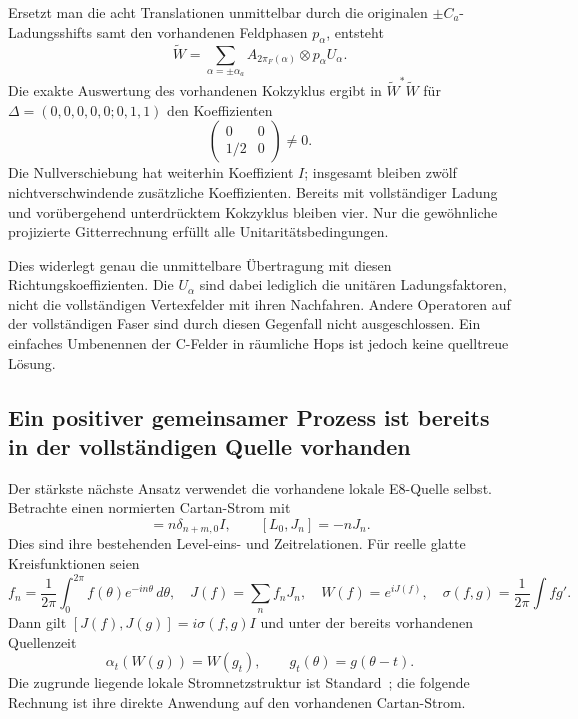 Ersetzt man die acht Translationen unmittelbar durch die originalen $\pm C_a$-Ladungsshifts samt den vorhandenen Feldphasen $p_\alpha$, entsteht
\begin{equation}
\widetilde W=\sum_{\alpha=\pm\alpha_a}A_{2\pi_F(\alpha)}\otimes p_\alpha U_\alpha.
\end{equation}
Die exakte Auswertung des vorhandenen Kokzyklus ergibt in $\widetilde W^*\widetilde W$ für
$\Delta=(0,0,0,0,0;0,1,1)$ den Koeffizienten
\begin{equation}\label{eq:nativehopfailure}
\boxed{\begin{pmatrix}0&0\\1/2&0\end{pmatrix}\ne0.}
\end{equation}
Die Nullverschiebung hat weiterhin Koeffizient $I$; insgesamt bleiben zwölf nichtverschwindende zusätzliche Koeffizienten. Bereits mit vollständiger Ladung und vorübergehend unterdrücktem Kokzyklus bleiben vier. Nur die gewöhnliche projizierte Gitterrechnung erfüllt alle Unitaritätsbedingungen.

Dies widerlegt genau die unmittelbare Übertragung mit diesen Richtungskoeffizienten. Die $U_\alpha$ sind dabei lediglich die unitären Ladungsfaktoren, nicht die vollständigen Vertexfelder mit ihren Nachfahren. Andere Operatoren auf der vollständigen Faser sind durch diesen Gegenfall nicht ausgeschlossen. Ein einfaches Umbenennen der C-Felder in räumliche Hops ist jedoch keine quelltreue Lösung.

\subsection{Ein positiver gemeinsamer Prozess ist bereits in der vollständigen Quelle vorhanden}
Der stärkste nächste Ansatz verwendet die vorhandene lokale E8-Quelle selbst. Betrachte einen normierten Cartan-Strom mit
\begin{equation}
[J_n,J_m]=n\delta_{n+m,0}I,\qquad [L_0,J_n]=-nJ_n.
\end{equation}
Dies sind ihre bestehenden Level-eins- und Zeitrelationen. Für reelle glatte Kreisfunktionen seien
\begin{equation}
f_n=\frac1{2\pi}\int_0^{2\pi}f(\theta)e^{-in\theta}\,d\theta,
\quad J(f)=\sum_n f_nJ_n,
\quad W(f)=e^{iJ(f)},
\quad \sigma(f,g)=\frac1{2\pi}\int f g'.
\end{equation}
Dann gilt $[J(f),J(g)]=i\sigma(f,g)I$ und unter der bereits vorhandenen Quellenzeit
\begin{equation}
\alpha_t(W(g))=W(g_t),\qquad g_t(\theta)=g(\theta-t).
\end{equation}
Die zugrunde liegende lokale Stromnetzstruktur ist Standard~\cite{tanimotojoint}; die folgende Rechnung ist ihre direkte Anwendung auf den vorhandenen Cartan-Strom.

